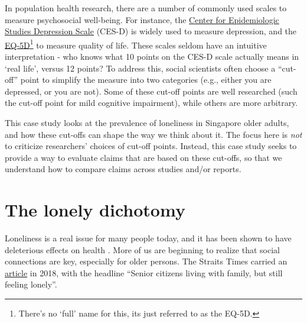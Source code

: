 \documentclass[openany]{book}
\let\rmarkdownfootnote\footnote%
\def\footnote{\protect\rmarkdownfootnote}
\begin{document}
In population health research, there are a number of commonly used
scales to measure psychosocial well-being. For instance, the
\href{https://www.apa.org/pi/about/publications/caregivers/practice-settings/assessment/tools/depression-scale}{Center
for Epidemiologic Studies Depression Scale} (CES-D) is widely used to
measure depression, and the
\href{https://euroqol.org/eq-5d-instruments/}{EQ-5D}\footnote{There's no
  `full' name for this, its just referred to as the EQ-5D.} to measure
quality of life. These scales seldom have an intuitive interpretation -
who knows what 10 points on the CES-D scale actually means in `real
life', versus 12 points? To address this, social scientists often choose
a ``cut-off'' point to simplify the measure into two categories (e.g.,
either you are depressed, or you are not). Some of these cut-off points
are well researched (such the cut-off point for mild cognitive
impairment), while others are more arbitrary.

This case study looks at the prevalence of loneliness in Singapore older
adults, and how these cut-offs can shape the way we think about it. The
focus here is \emph{not} to criticize researchers' choices of cut-off
points. Instead, this case study seeks to provide a way to evaluate
claims that are based on these cut-offs, so that we understand how to
compare claims across studies and/or reports.

\section{The lonely dichotomy}\label{the-lonely-dichotomy}

Loneliness is a real issue for many people today, and it has been shown
to have deleterious effects on health
\citep{rico-uribe_association_2018}. More of us are beginning to realize
that social connections are key, especially for older persons. The
Straits Times carried an
\href{https://www.straitstimes.com/singapore/living-with-family-but-still-feeling-lonely}{article}
in 2018, with the headline ``Senior citizens living with family, but
still feeling lonely''.
\end{document}
